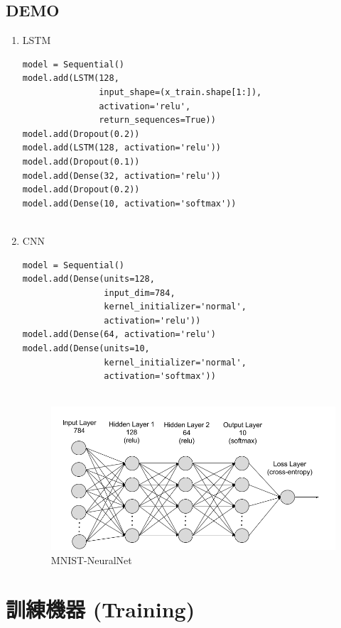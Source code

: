 \documentclass[a4paper,12pt]{article}
\begin{document}
\subsection{DEMO}
\label{sec:orgd027c45}
\begin{enumerate}
\item LSTM
\label{sec:org51dc121}
\lstset{breaklines=true,language=Python,label= ,caption= ,captionpos=b,numbers=none}
\begin{lstlisting}
model = Sequential()
model.add(LSTM(128,
               input_shape=(x_train.shape[1:]),
               activation='relu',
               return_sequences=True))
model.add(Dropout(0.2))
model.add(LSTM(128, activation='relu'))
model.add(Dropout(0.1))
model.add(Dense(32, activation='relu'))
model.add(Dropout(0.2))
model.add(Dense(10, activation='softmax'))


\end{lstlisting}
\item CNN
\label{sec:orga102c83}
\lstset{breaklines=true,language=Python,label= ,caption= ,captionpos=b,numbers=none}
\begin{lstlisting}
model = Sequential()
model.add(Dense(units=128,
                input_dim=784,
                kernel_initializer='normal',
                activation='relu'))
model.add(Dense(64, activation='relu')
model.add(Dense(units=10,
                kernel_initializer='normal',
                activation='softmax'))


\end{lstlisting}
\begin{figure}[htbp]
\centering
\includegraphics[width=400px]{images/MNIST-CNN.png}
\caption{\label{fig:MNIST-NeuralNet}MNIST-NeuralNet}
\end{figure}
\end{enumerate}

\section{訓練機器 (Training)}
\label{sec:org4774706}
\end{document}
